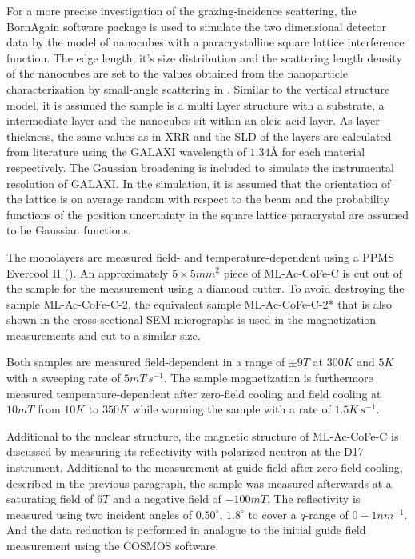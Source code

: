 \documentclass[\main/dresen_thesis.tex]{subfiles}
\begin{document}
      For a more precise investigation of the grazing-incidence scattering, the BornAgain software package \cite{Burle_2018_borna} is used to simulate the two dimensional detector data by the model of nanocubes with a paracrystalline square lattice interference function.
      The edge length, it's size distribution and the scattering length density of the nanocubes are set to the values obtained from the nanoparticle characterization by small-angle scattering in .
      Similar to the vertical structure model, it is assumed the sample is a multi layer structure with a  substrate, a  intermediate layer and the nanocubes sit within an oleic acid layer.
      As layer thickness, the same values as in XRR and the SLD of the layers are calculated from literature using the GALAXI wavelength of $1.34 \unit{\angstrom}$ for each material respectively.
      The Gaussian broadening is included to simulate the instrumental resolution of GALAXI.
      In the simulation, it is assumed that the orientation of the lattice is on average random with respect to the beam and the probability functions of the position uncertainty in the square lattice paracrystal are assumed to be Gaussian functions.

      The monolayers are measured field- and temperature-dependent using a PPMS Evercool II ().
      An approximately $5 \times 5 \unit{mm^2}$ piece of ML-Ac-CoFe-C is cut out of the sample for the measurement using a diamond cutter.
      To avoid destroying the sample ML-Ac-CoFe-C-2, the equivalent sample ML-Ac-CoFe-C-2* that is also shown in the cross-sectional SEM micrographs is used in the magnetization measurements and cut to a similar size.

      Both samples are measured field-dependent in a range of $\pm 9 \unit{T}$ at $300 \unit{K}$ and $5 \unit{K}$ with a sweeping rate of $5 \unit{mT \, s^{-1}}$.
      The sample magnetization is furthermore measured temperature-dependent after zero-field cooling and field cooling at $10 \unit{mT}$ from $10 \unit{K}$ to $350 \unit{K}$ while warming the sample with a rate of $1.5 \unit{K \, s^{-1}}$.

      Additional to the nuclear structure, the magnetic structure of ML-Ac-CoFe-C is discussed by measuring its reflectivity with polarized neutron at the D17 instrument.
      Additional to the measurement at guide field after zero-field cooling, described in the previous paragraph, the sample was measured afterwards at a saturating field of $6 \unit{T}$ and a negative field of $-100 \unit{mT}$.
      The reflectivity is measured using two incident angles of $0.50^\circ ,\, 1.8^\circ$ to cover a $q$-range of $0 - 1 \unit{nm^{-1}}$.
      And the data reduction is performed in analogue to the initial guide field measurement using the COSMOS software.
\end{document}
